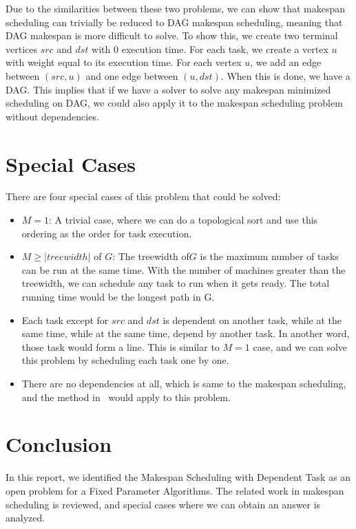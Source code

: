 \documentclass{article}
\begin{document}
Due to the similarities between these two problems, we can show that makespan
scheduling can trivially be reduced to DAG makespan scheduling, meaning
that DAG makespan is more difficult to solve. To show this,
we create two terminal vertices $src$ and $dst$ with 0 execution time. For each
task, we create a vertex $u$ with weight equal to its execution time. For each
vertex $u$, we add an edge between $(src,u)$ and one edge between $(u,dst)$.
When this is done, we have a DAG.
This implies that if we have a solver to solve any makespan minimized
scheduling on DAG, we could also apply it to the makespan scheduling problem
without dependencies.

\section{Special Cases}
There are four special cases of this problem that could be solved:
\begin{itemize}
\item $M = 1$: A trivial case, where we can do a topological sort and use this
ordering as the order for task execution.
  \item $M \geq |treewidth|$ of $G$: The treewidth of$G$ is the maximum 
  number of tasks can be run at the same time. With the number of machines 
  greater than the treewidth, we can schedule any task to run when it 
  gets ready. The total running time would be the longest path in G.
\item Each task except for $src$ and $dst$ is dependent on another task,
while at the same time, while at the same time, depend by another task.
In another word, those task would form a line. This is similar to $M=1$
case, and we can solve this problem by scheduling each task one by one.
\item There are no dependencies at all, which is same to the makespan
scheduling, and the method in~\cite{mnich2015scheduling} would apply
to this problem.
\end{itemize}

\section{Conclusion}
In this report, we identified the Makespan Scheduling with Dependent 
Task as an open problem for a Fixed Parameter Algorithms. The related work
in makespan scheduling is reviewed, and special cases where we can
obtain an answer is analyzed.
    


\end{document}
